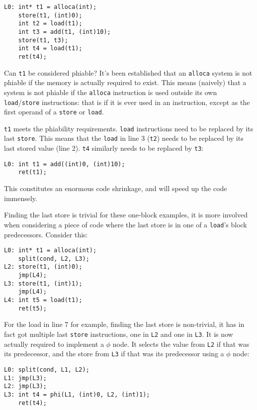 \documentclass[12pt, a4paper]{article}
\begin{document}
\begin{lstlisting}
L0:	int* t1 = alloca(int);
	store(t1, (int)0);
	int t2 = load(t1);
	int t3 = add(t1, (int)10);
	store(t1, t3);
	int t4 = load(t1);
	ret(t4);
\end{lstlisting}

Can \verb+t1+ be considered phiable? It's been established that an \verb+alloca+ system 
is not phiable if the memory is actually required to exist. This means (naively) 
that a system is not phiable if the \verb+alloca+ instruction is used outside 
its own \verb+load+/\verb+store+ instructions: that is if it is ever used in an 
instruction, except as the first operand of a \verb+store+ or \verb+load+.

\verb+t1+ meets the phiability requirements. \verb+load+ instructions need to be 
replaced by its last \verb+store+. This means that the \verb+load+ in line 3 
(\verb+t2+) needs to be replaced by its last stored value (line 2). \verb+t4+ 
similarly needs to be replaced by \verb+t3+:

\begin{lstlisting}
L0:	int t1 = add((int)0, (int)10);
	ret(t1);
\end{lstlisting}

This constitutes an enormous code shrinkage, and will speed up the code 
immensely.

Finding the last store is trivial for these one-block examples, it is more 
involved when considering a piece of code where the last store is in one of a 
\verb+load+'s block predecessors. Consider this:

\begin{lstlisting}
L0:	int* t1 = alloca(int);
	split(cond, L2, L3);
L2:	store(t1, (int)0);
	jmp(L4);
L3:	store(t1, (int)1);
	jmp(L4);
L4:	int t5 = load(t1);
	ret(t5);
\end{lstlisting}

For the load in line 7 for example, finding the last store is non-trivial, it 
has in fact got multiple last \verb+store+ instructions, one in \verb+L2+ and one in 
\verb+L3+. It is now actually required to implement a  $\phi$ node. It selects 
the value from \verb+L2+ if that was its predecessor, and the store from \verb+L3+ if 
that was its predecessor using a $\phi$ node:

\begin{lstlisting}
L0:	split(cond, L1, L2);
L1:	jmp(L3);
L2:	jmp(L3);
L3:	int t4 = phi(L1, (int)0, L2, (int)1);
	ret(t4);
\end{lstlisting}
\end{document}
